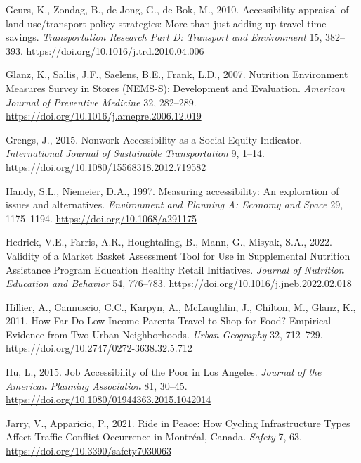 \documentclass[
  letterpaper,
  DIV=11,
  numbers=noendperiod]{scrreport}
\newlength{\cslhangindent}
\newlength{\cslentryspacingunit} %
\newenvironment{CSLReferences}[2] %
 {%
  \setlength{\parindent}{0pt}
  \ifodd #1
  \let\oldpar\par
  \def\par{\hangindent=\cslhangindent\oldpar}
  \fi
  \setlength{\parskip}{#2\cslentryspacingunit}
 }%
 {}
\begin{document}
\begin{CSLReferences}{1}{0}
\leavevmode{}%
Geurs, K., Zondag, B., de Jong, G., de Bok, M., 2010. Accessibility
appraisal of land-use/transport policy strategies: {More} than just
adding up travel-time savings. \emph{Transportation Research Part D:
Transport and Environment} 15, 382--393.
\url{https://doi.org/10.1016/j.trd.2010.04.006}

\leavevmode{}%
Glanz, K., Sallis, J.F., Saelens, B.E., Frank, L.D., 2007. Nutrition
{Environment Measures Survey} in {Stores} ({NEMS-S}): {Development} and
{Evaluation}. \emph{American Journal of Preventive Medicine} 32,
282--289. \url{https://doi.org/10.1016/j.amepre.2006.12.019}

\leavevmode{}%
Grengs, J., 2015. Nonwork {Accessibility} as a {Social Equity
Indicator}. \emph{International Journal of Sustainable Transportation}
9, 1--14. \url{https://doi.org/10.1080/15568318.2012.719582}

\leavevmode{}%
Handy, S.L., Niemeier, D.A., 1997. Measuring accessibility: {An}
exploration of issues and alternatives. \emph{Environment and Planning
A: Economy and Space} 29, 1175--1194.
\url{https://doi.org/10.1068/a291175}

\leavevmode{}%
Hedrick, V.E., Farris, A.R., Houghtaling, B., Mann, G., Misyak, S.A.,
2022. Validity of a {Market Basket Assessment Tool} for {Use} in
{Supplemental Nutrition Assistance Program Education Healthy Retail
Initiatives}. \emph{Journal of Nutrition Education and Behavior} 54,
776--783. \url{https://doi.org/10.1016/j.jneb.2022.02.018}

\leavevmode{}%
Hillier, A., Cannuscio, C.C., Karpyn, A., McLaughlin, J., Chilton, M.,
Glanz, K., 2011. How {Far Do Low-Income Parents Travel} to {Shop} for
{Food}? {Empirical Evidence} from {Two Urban Neighborhoods}. \emph{Urban
Geography} 32, 712--729.
\url{https://doi.org/10.2747/0272-3638.32.5.712}

\leavevmode{}%
Hu, L., 2015. Job {Accessibility} of the {Poor} in {Los Angeles}.
\emph{Journal of the American Planning Association} 81, 30--45.
\url{https://doi.org/10.1080/01944363.2015.1042014}

\leavevmode{}%
Jarry, V., Apparicio, P., 2021. Ride in {Peace}: {How Cycling
Infrastructure Types Affect Traffic Conflict Occurrence} in {Montréal},
{Canada}. \emph{Safety} 7, 63.
\url{https://doi.org/10.3390/safety7030063}


\end{CSLReferences}
\end{document}
